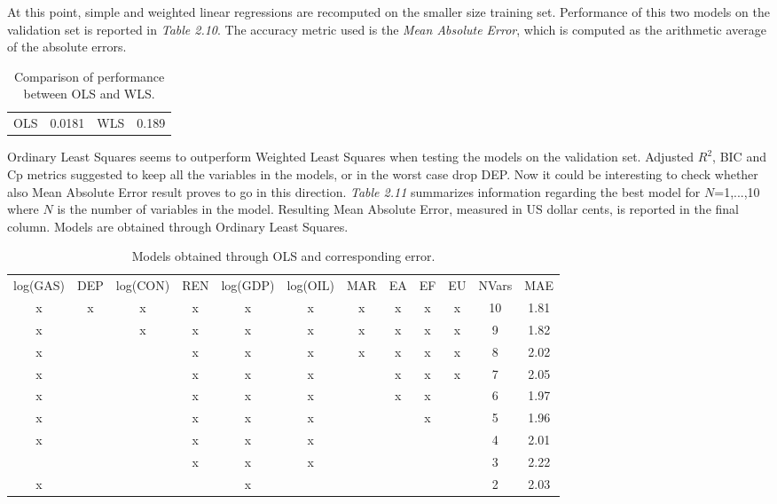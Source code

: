 \documentclass{book}
\begin{document}
At this point, simple and weighted linear regressions are recomputed on the smaller size training set. Performance of this two models on the validation set is reported in \textit{Table 2.10}. The accuracy metric used is the \textit{Mean Absolute Error}, which is computed as the arithmetic average of the absolute errors.

\bigskip
\begin{table}[H]
\begin{center}
\begin{tabular}{|c|c|c|c|}
\hline
\rowcolor{maroon} \multicolumn{4}{|c|}{Mean Absolute Error}\\
\hline
OLS&0.0181&WLS&0.189\\
\hline
\end{tabular}
\caption{Comparison of performance between OLS and WLS.}
\end{center}
\end{table}
\bigskip

Ordinary Least Squares seems to outperform Weighted Least Squares when testing the models on the validation set. Adjusted $R^2$, BIC and Cp metrics suggested to keep all the variables in the models, or in the worst case drop DEP. Now it could be interesting to check whether also Mean Absolute Error result proves to go in this direction. \textit{Table 2.11} summarizes information regarding the best model for $N$=1,...,10 where $N$ is the number of variables in the model. Resulting Mean Absolute Error, measured in US dollar cents, is reported in the final column. Models are obtained through Ordinary Least Squares.

\bigskip
\begin{table}[H]
\begin{center}
\begin{tabular}{|c|c|c|c|c|c|c|c|c|c|c|c|}
\hline
\rowcolor{lightgray} \multicolumn{12}{|c|}{Mean Absolute Error, OLS}\\
\hline
log(GAS)&DEP&log(CON)&REN&log(GDP)&log(OIL)&MAR&EA&EF&EU&NVars&MAE\\
\hline
x&x&x&x&x&x&x&x&x&x&10&1.81\\
x&&x&x&x&x&x&x&x&x&9&1.82\\
x&&&x&x&x&x&x&x&x&8&2.02\\
x&&&x&x&x&&x&x&x&7&2.05\\
x&&&x&x&x&&x&x&&6&1.97\\
x&&&x&x&x&&&x&&5&1.96\\
x&&&x&x&x&&&&&4&2.01\\
&&&x&x&x&&&&&3&2.22\\
x&&&&x&&&&&&2&2.03\\
\hline
\end{tabular}
\caption{Models obtained through OLS and corresponding error.}
\end{center}
\end{table}
\bigskip
\end{document}
